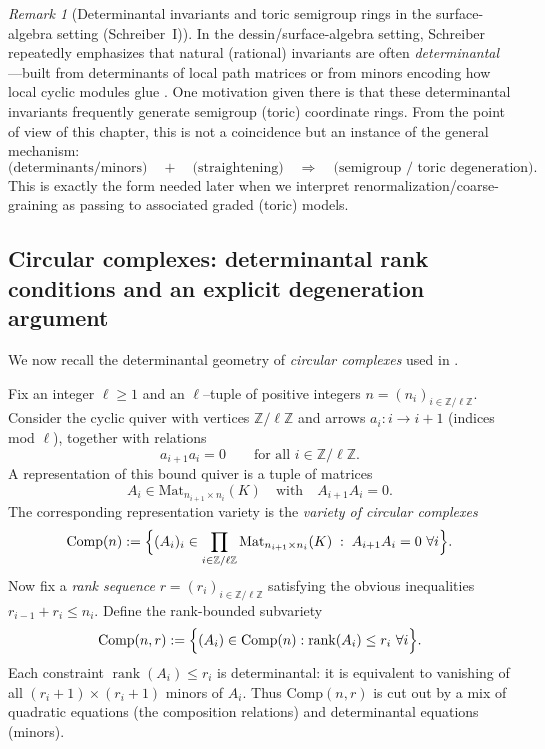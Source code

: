 \documentclass[11pt,oneside]{amsbook}
\numberwithin{equation}{section}
\theoremstyle{plain}
\theoremstyle{definition}
\theoremstyle{remark}
\newtheorem{remark}[theorem]{Remark}
\newcommand{\Z}{\mathbb{Z}}
\DeclareMathOperator{\rank}{\mathrm{rank}}
\begin{document}
\begin{remark}[Determinantal invariants and toric semigroup rings in the surface-algebra setting (Schreiber~I)]
In the dessin/surface-algebra setting, Schreiber repeatedly emphasizes that natural (rational) invariants are often \emph{determinantal}---built from determinants of local path matrices or from minors encoding how local cyclic modules glue \cite{Schreiber2018SurfaceAlgebrasI}.
One motivation given there is that these determinantal invariants frequently generate semigroup (toric) coordinate rings.
From the point of view of this chapter, this is not a coincidence but an instance of the general mechanism:
\[
\text{(determinants/minors)}\quad+\quad \text{(straightening)}\quad\Longrightarrow\quad \text{(semigroup / toric degeneration)}.
\]
This is exactly the form needed later when we interpret renormalization/coarse-graining as passing to associated graded (toric) models.
\end{remark}



\subsection{Circular complexes: determinantal rank conditions and an explicit degeneration argument}
\label{sec:circular_complexes_determinantal}
We now recall the determinantal geometry of \emph{circular complexes} used in \cite{CarrollChindrisKinserWeyman2018ModuliSpecialBiserial}.

Fix an integer $\ell\ge 1$ and an $\ell$--tuple of positive integers $n=(n_i)_{i\in\Z/\ell\Z}$.
Consider the cyclic quiver with vertices $\Z/\ell\Z$ and arrows $a_i:i\to i+1$ (indices mod $\ell$), together with relations
\[
a_{i+1}a_i=0\qquad \text{for all }i\in\Z/\ell\Z.
\]
A representation of this bound quiver is a tuple of matrices
\[
A_i\in \mathrm{Mat}_{n_{i+1}\times n_i}(K)
\quad \text{with}\quad A_{i+1}A_i=0.
\]
The corresponding representation variety is the \emph{variety of circular complexes}
\[
\mathrm{Comp}(n):=\Bigl\{(A_i)_i\in \prod_{i\in\Z/\ell\Z}\mathrm{Mat}_{n_{i+1}\times n_i}(K)\;:\;A_{i+1}A_i=0\ \forall i\Bigr\}.
\]
Now fix a \emph{rank sequence} $r=(r_i)_{i\in\Z/\ell\Z}$ satisfying the obvious inequalities $r_{i-1}+r_i\le n_i$.
Define the rank-bounded subvariety
\[
\mathrm{Comp}(n,r):=\Bigl\{(A_i)\in \mathrm{Comp}(n): \rank(A_i)\le r_i\ \forall i\Bigr\}.
\]
Each constraint $\rank(A_i)\le r_i$ is determinantal: it is equivalent to vanishing of all $(r_i+1)\times (r_i+1)$ minors of $A_i$.
Thus $\mathrm{Comp}(n,r)$ is cut out by a mix of quadratic equations (the composition relations) and determinantal equations (minors).
\end{document}
